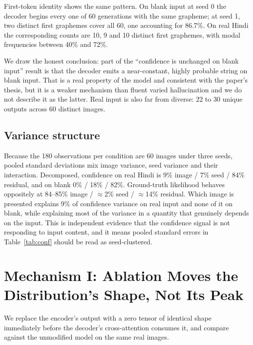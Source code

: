 \documentclass{article}
\begin{document}
First-token identity shows the same pattern. On blank input at seed 0 the decoder begins every
one of 60 generations with the same grapheme; at seed 1, two distinct first graphemes cover
all 60, one accounting for 86.7\%. On real Hindi the corresponding counts are 10, 9 and 10
distinct first graphemes, with modal frequencies between 40\% and 72\%.

We draw the honest conclusion: part of the ``confidence is unchanged on blank input'' result
is that the decoder emits a near-constant, highly probable string on blank input. That is a
real property of the model and consistent with the paper's thesis, but it is a weaker
mechanism than fluent varied hallucination and we do not describe it as the latter. Real input
is also far from diverse: 22 to 30 unique outputs across 60 distinct images.

\subsection{Variance structure}
\label{sec:variance}

Because the 180 observations per condition are 60 images under three seeds, pooled standard
deviations mix image variance, seed variance and their interaction. Decomposed, confidence on
real Hindi is 9\% image / 7\% seed / 84\% residual, and on blank 0\% / 18\% / 82\%.
Ground-truth likelihood behaves oppositely at 84--85\% image / $\approx$2\% seed /
$\approx$14\% residual. Which image is presented explains 9\% of confidence variance on real
input and none of it on blank, while explaining most of the variance in a quantity that
genuinely depends on the input. This is independent evidence that the confidence signal is not
responding to input content, and it means pooled standard errors in Table~\ref{tab:conf}
should be read as seed-clustered.

\section{Mechanism I: Ablation Moves the Distribution's Shape, Not Its Peak}
\label{sec:ablation}

We replace the encoder's output with a zero tensor of identical shape immediately before the
decoder's cross-attention consumes it, and compare against the unmodified model on the same
real images.
\end{document}
